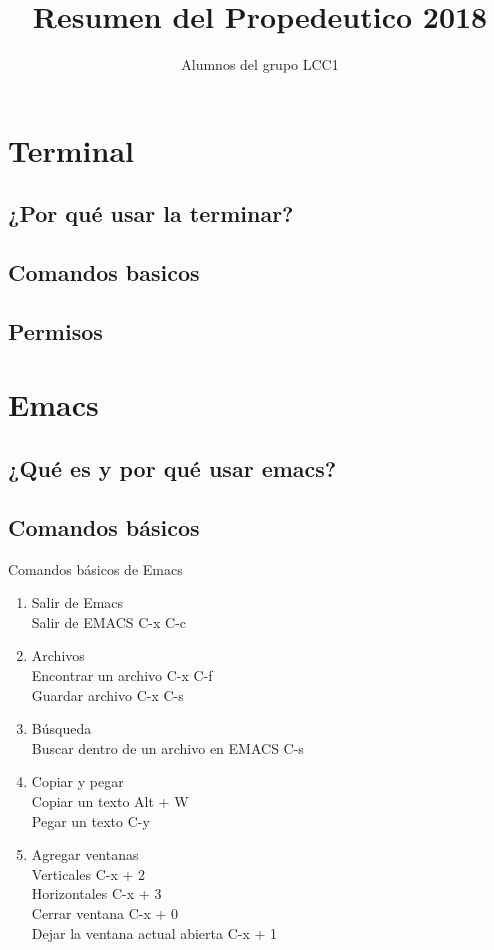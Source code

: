 \documentclass[11pt,letterpaper]{article}
\title{Resumen del Propedeutico 2018}
\author{Alumnos del grupo LCC1}
\begin{document}
\maketitle
\section{Terminal}
\subsection{¿Por qué usar la terminar?}
\subsection{Comandos basicos}
\subsection{Permisos}
\section{Emacs}
\subsection{¿Qué es y por qué usar emacs?}
\subsection{Comandos básicos}
\large {Comandos básicos de Emacs}
\begin{enumerate}
\item Salir de Emacs\\
  Salir de EMACS C-x C-c
\item Archivos\\
  Encontrar un archivo C-x C-f\\
  Guardar archivo C-x C-s
\item Búsqueda\\
  Buscar dentro de un archivo en EMACS C-s
\item Copiar y pegar\\
  Copiar un texto Alt + W\\
  Pegar un texto C-y
\item Agregar ventanas\\
  Verticales C-x + 2\\
  Horizontales C-x + 3\\
  Cerrar ventana C-x + 0\\
  Dejar la ventana actual abierta C-x + 1\\
  
\end{enumerate}  
\end{document}
